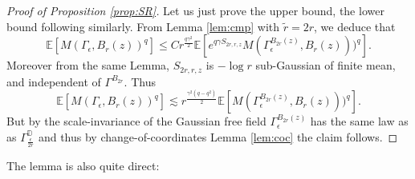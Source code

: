 \documentclass[11pt]{amsart}
\newcommand{\D}{\mathbb D}
\newcommand{\E}{\mathbb E}
\renewcommand{\1}{\mathbf 1}
\newcommand{\eps}{\epsilon}
\begin{document}
\begin{proof}[Proof of Proposition \ref{prop:SR}]
Let us just prove the upper bound, the lower bound following similarly.
From Lemma \ref{lem:cmp} with $\tilde r = 2r$, we deduce that
$$\E \left[M(\Gamma_\eps, B_r(z))^q\right] \leq C r^{\frac{q\gamma^2}{2}}\E\left[e^{q\gamma S_{2r,r,z}} M(\Gamma_\eps^{B_{2r}(z)}, B_r(z)))^q\right].$$
Moreover from the same Lemma, $S_{2r, r, z}$ is $-\log r$ sub-Gaussian of finite mean, and independent of $\Gamma^{B_{2r}}$. Thus
$$\E \left[M(\Gamma_\eps, B_r(z))^q\right] \lesssim r^{\frac{\gamma^2(q-q^2)}{2}} \E \left[M(\Gamma_\eps^{B_{2r}(z)}, B_r(z)))^q\right].$$
But by the scale-invariance of the Gaussian free field $\Gamma_\eps^{B_{2r}(z)}$ has the same law as as $\Gamma_{\frac{\eps}{2r}}^{\D}$ and thus by change-of-coordinates Lemma \ref{lem:coc} the claim follows.
\end{proof}

The lemma is also quite direct:
\end{document}

